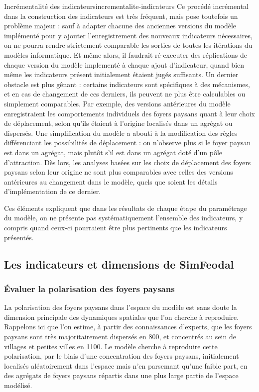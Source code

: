 \begin{encadre}{Incrémentalité des indicateurs}{incrementalite-indicateurs}
Ce procédé incrémental dans la construction des indicateurs est très fréquent, mais pose toutefois un problème majeur :
sauf à adapter chacune des anciennes versions du modèle implémenté pour y ajouter l'enregistrement des nouveaux indicateurs nécessaires, on ne pourra rendre strictement comparable les sorties de toutes les itérations du modèles informatique.
Et même alors, il faudrait ré-executer des réplications de chaque version du modèle implementé à chaque ajout d'indicateur, quand bien même les indicateurs présent initialement étaient jugés suffisants.
Un dernier obstacle est plus gênant :
certains indicateurs sont spécifiques à des mécanismes, et en cas de changement de ces derniers, ils peuvent ne plus être calculables ou simplement comparables.
Par exemple, des versions antérieures du modèle enregistraient les comportements individuels des foyers paysans quant à leur \og choix\fg{} de déplacement, selon qu'ils étaient à l'origine localisés dans un agrégat ou dispersés.
Une simplification du modèle a abouti à la modification des règles différenciant les possibilités de déplacement :
on n'observe plus si le foyer paysan est dans un agrégat, mais plutôt s'il est dans un agrégat doté d'un pôle d'attraction.
Dès lors, les analyses basées sur les choix de déplacement des foyers paysans selon leur origine ne sont plus comparables avec celles des versions antérieures au changement dans le modèle, quels que soient les détails d'implémentation de ce dernier.

Ces éléments expliquent que dans les résultats de chaque étape du paramétrage du modèle, on ne présente pas systématiquement l'ensemble des indicateurs, y compris quand ceux-ci pourraient être plus pertinents que les indicateurs présentés.
\end{encadre}

\clearpage
\subsection{Les indicateurs et dimensions de SimFeodal}

\subsubsection{Évaluer la polarisation des foyers paysans \label{subsub:polarisation}}

La polarisation des foyers paysans dans l'espace du modèle est sans doute la dimension principale des dynamiques spatiales que l'on cherche à reproduire.
Rappelons ici que l'on estime, à partir des connaissances d'experts, que les foyers paysans sont très majoritairement dispersés en 800, et concentrés au sein de villages et petites villes en 1100.
Le modèle cherche à reproduire cette polarisation, par le biais d'une concentration des foyers paysans, initialement localisés aléatoirement dans l'espace mais n'en parsemant qu'une faible part, en des agrégats de foyers paysans répartis dans une plus large partie de l'espace modélisé.

